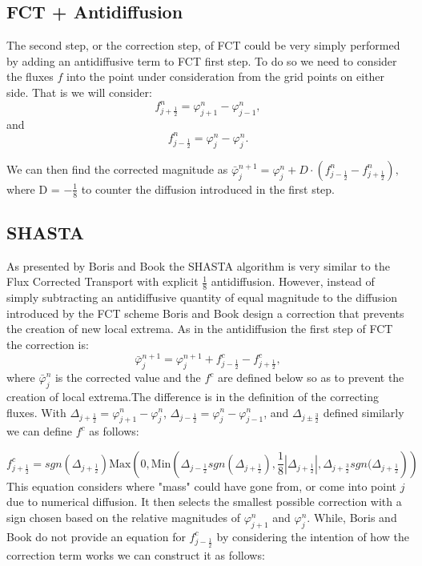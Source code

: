 \documentclass[]{article}
\begin{document}
\subsection{FCT + Antidiffusion}
The second step, or the correction step, of FCT could be very simply performed by adding an antidiffusive term to FCT first step. To do so we need to consider the fluxes $f$ into the point under consideration from the grid points on either side. That is we will consider:
\begin{equation}
f^n_{j+\frac{1}{2}} = \varphi^n_{j+1}-\varphi^n_{j-1},
\end{equation}
and 
\begin{equation}
f^n_{j-\frac{1}{2}} = \varphi^n_{j}-\varphi^n_{j}.
\end{equation}

We can then find the corrected magnitude as $\bar{\varphi}^{n+1}_j = \varphi_j^n + D\cdot \left(f^n_{j-\frac{1}{2}}-f^n_{j+\frac{1}{2}}\right),$ where D = $-\frac{1}{8}$ to counter the diffusion introduced in the first step.  
\subsection{SHASTA}
As presented by Boris and Book \cite{shasta} the SHASTA algorithm is very similar to the Flux Corrected Transport with explicit $\frac{1}{8}$ antidiffusion. However, instead of simply subtracting an antidiffusive quantity of equal magnitude to the diffusion introduced by the FCT scheme Boris and Book design a correction that prevents the creation of new local extrema. As in the antidiffusion the first step of FCT the correction is:
\begin{equation}
\bar{\varphi}^{n+1}_j = \varphi_j^{n+1} + f^c_{j-\frac{1}{2}}-f^c_{j+\frac{1}{2}},
\end{equation}
where $\bar{\varphi}^n_j$ is the corrected value and the $f^c$ are defined below so as to prevent the creation of local extrema.The difference is in the definition of the correcting fluxes. With $\Delta_{j+\frac{1}{2}} = \varphi^n_{j+1} - \varphi^n_{j}$, $\Delta_{j-\frac{1}{2}} = \varphi^n_{j} - \varphi^n_{j-1}$, and $\Delta_{j\pm\frac{3}{2}}$ defined similarly we can define $f^c$ as follows:

\begin{equation}
f^c_{j+\frac{1}{2}} = sgn(\Delta_{j+\frac{1}{2}}) \text{Max}\left(0,\text{Min}\left(\Delta_{j-\frac{1}{2}} sgn(\Delta_{j+\frac{1}{2}}), \frac{1}{8}|\Delta_{j+\frac{1}{2}}|,\Delta_{j+\frac{3}{2}} sgn(\Delta_{j+\frac{1}{2}}\right)\right)
\label{eq:def_fc_right}
\end{equation}
This equation considers where "mass" could have gone from, or come into point $j$ due to numerical diffusion. It then selects the smallest possible correction with a sign chosen based on the relative magnitudes of $\varphi^n_{j+1}$ and $\varphi^n_{j}$. While, Boris and Book do not provide an equation for $f^c_{j-\frac{1}{2}}$ by considering the intention of how the correction term works we can construct it as follows:
\end{document}
